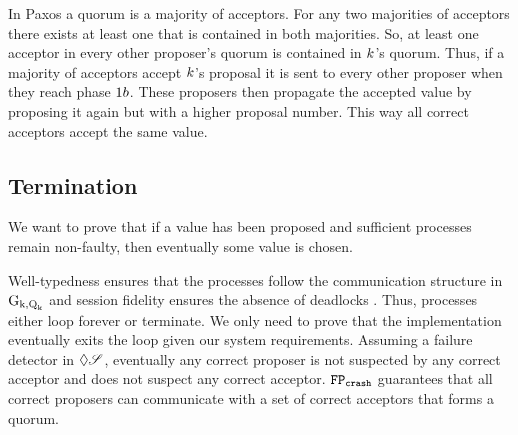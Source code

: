 In Paxos a quorum is a majority of acceptors.
For any two majorities of acceptors there exists at least one that is contained in both majorities.
So, at least one acceptor in every other proposer's quorum is contained in $k$'s quorum.
Thus, if a majority of acceptors accept $k$'s proposal it is sent to every other proposer when they reach phase $1b$.
These proposers then propagate the accepted value by proposing it again but with a higher proposal number.
This way all correct acceptors accept the same value.

\subsection{Termination}

We want to prove that if a value has been proposed and sufficient processes remain non-faulty, then eventually some value is chosen.

Well-typedness ensures that the processes follow the communication structure in $\operatorname{G_{k, \operatorname{Q}_{k}}}$ and session fidelity ensures the absence of deadlocks \cite{PetersEtal21}.
Thus, processes either loop forever or terminate.
We only need to prove that the implementation eventually exits the loop given our system requirements.
Assuming a failure detector in $\Diamond\mathscr{S}$, eventually any correct proposer is not suspected by any correct acceptor and does not suspect any correct acceptor.
$\mathtt{FP_{crash}}$ guarantees that all correct proposers can communicate with a set of correct acceptors that forms a quorum.

